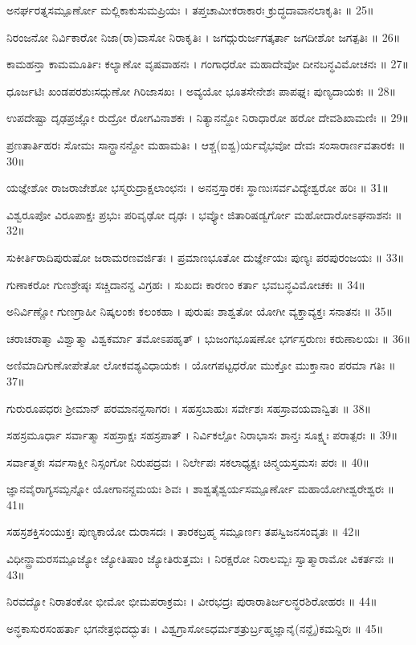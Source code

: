 ಅನರ್ಘರತ್ನಸಮ್ಪೂರ್ಣೋ ಮಲ್ಲಿಕಾಕುಸುಮಪ್ರಿಯಃ ।
ತಪ್ತಚಾಮೀಕರಾಕಾರಃ ಕ್ರುದ್ಧದಾವಾನಲಾಕೃತಿಃ ॥ 25॥

ನಿರಂಜನೋ ನಿರ್ವಿಕಾರೋ ನಿಜಾ(ರಾ)ವಾಸೋ ನಿರಾಕೃತಿಃ ।
ಜಗದ್ಗುರುರ್ಜಗತ್ಕರ್ತಾ ಜಗದೀಶೋ ಜಗತ್ಪತಿಃ ॥ 26॥

ಕಾಮಹನ್ತಾ ಕಾಮಮೂರ್ತಿಃ ಕಲ್ಯಾಣೋ ವೃಷವಾಹನಃ ।
ಗಂಗಾಧರೋ ಮಹಾದೇವೋ ದೀನಬನ್ಧವಿಮೋಚನಃ ॥ 27॥

ಧೂರ್ಜಟಿಃ ಖಂಡಪರಶುಃಸದ್ಗುಣೋ ಗಿರಿಜಾಸಖಃ ।
ಅವ್ಯಯೋ ಭೂತಸೇನೇಶಃ ಪಾಪಘ್ನಃ ಪುಣ್ಯದಾಯಕಃ ॥ 28॥

ಉಪದೇಷ್ಟಾ ದೃಢಪ್ರಜ್ಞೋ ರುದ್ರೋ ರೋಗವಿನಾಶಕಃ ।
ನಿತ್ಯಾನನ್ದೋ ನಿರಾಧಾರೋ ಹರೋ ದೇವಶಿಖಾಮಣಿಃ ॥ 29॥

ಪ್ರಣತಾರ್ತಿಹರಃ ಸೋಮಃ ಸಾನ್ದ್ರಾನನ್ದೋ ಮಹಾಮತಿಃ ।
ಆಶ್ಚ(ಐಶ್ವ)ರ್ಯವೈಭವೋ ದೇವಃ ಸಂಸಾರಾರ್ಣವತಾರಕಃ ॥ 30॥

ಯಜ್ಞೇಶೋ ರಾಜರಾಜೇಶೋ ಭಸ್ಮರುದ್ರಾಕ್ಷಲಾಂಛನಃ ।
ಅನನ್ತಸ್ತಾರಕಃ ಸ್ಥಾಣುಃಸರ್ವವಿದ್ಯೇಶ್ವರೋ ಹರಿಃ ॥ 31॥

ವಿಶ್ವರೂಪೋ ವಿರೂಪಾಕ್ಷಃ ಪ್ರಭುಃ ಪರಿವೃಢೋ ದೃಢಃ ।
ಭವ್ಯೋ ಜಿತಾರಿಷಡ್ವರ್ಗೋ ಮಹೋದಾರೋಽಘನಾಶನಃ ॥ 32॥

ಸುಕೀರ್ತಿರಾದಿಪುರುಷೋ ಜರಾಮರಣವರ್ಜಿತಃ ।
ಪ್ರಮಾಣಭೂತೋ ದುರ್ಜ್ಞೇಯಃ ಪುಣ್ಯಃ ಪರಪುರಂಜಯಃ ॥ 33॥

ಗುಣಾಕರೋ ಗುಣಶ್ರೇಷ್ಠಃ ಸಚ್ಚಿದಾನನ್ದ ವಿಗ್ರಹಃ ।
ಸುಖದಃ ಕಾರಣಂ ಕರ್ತಾ ಭವಬನ್ಧವಿಮೋಚಕಃ ॥ 34॥

ಅನಿರ್ವಿಣ್ಣೋ ಗುಣಗ್ರಾಹೀ ನಿಷ್ಕಲಂಕಃ ಕಲಂಕಹಾ ।
ಪುರುಷಃ ಶಾಶ್ವತೋ ಯೋಗೀ ವ್ಯಕ್ತಾವ್ಯಕ್ತಃ ಸನಾತನಃ ॥ 35॥

ಚರಾಚರಾತ್ಮಾ ವಿಶ್ವಾತ್ಮಾ ವಿಶ್ವಕರ್ಮಾ ತಮೋಽಪಹೃತ್ ।
ಭುಜಂಗಭೂಷಣೋ ಭರ್ಗಸ್ತರುಣಃ ಕರುಣಾಲಯಃ ॥ 36॥

ಅಣಿಮಾದಿಗುಣೋಪೇತೋ ಲೋಕವಶ್ಯವಿಧಾಯಕಃ ।
ಯೋಗಪಟ್ಟಧರೋ ಮುಕ್ತೋ ಮುಕ್ತಾನಾಂ ಪರಮಾ ಗತಿಃ ॥ 37॥

ಗುರುರೂಪಧರಃ ಶ್ರೀಮಾನ್ ಪರಮಾನನ್ದಸಾಗರಃ ।
ಸಹಸ್ರಬಾಹುಃ ಸರ್ವೇಶಃ ಸಹಸ್ರಾವಯವಾನ್ವಿತಃ ॥ 38॥

ಸಹಸ್ರಮೂರ್ಧಾ ಸರ್ವಾತ್ಮಾ ಸಹಸ್ರಾಕ್ಷಃ ಸಹಸ್ರಪಾತ್ ।
ನಿರ್ವಿಕಲ್ಪೋ ನಿರಾಭಾಸಃ ಶಾನ್ತಃ ಸೂಕ್ಷ್ಮಃ ಪರಾತ್ಪರಃ ॥ 39॥

ಸರ್ವಾತ್ಮಕಃ ಸರ್ವಸಾಕ್ಷೀ ನಿಸ್ಸಂಗೋ ನಿರುಪದ್ರವಃ ।
ನಿರ್ಲೇಪಃ ಸಕಲಾಧ್ಯಕ್ಷಃ ಚಿನ್ಮಯಸ್ತಮಸಃ ಪರಃ ॥ 40॥

ಜ್ಞಾನವೈರಾಗ್ಯಸಮ್ಪನ್ನೋ ಯೋಗಾನನ್ದಮಯಃ ಶಿವಃ ।
ಶಾಶ್ವತೈಶ್ವರ್ಯಸಮ್ಪೂರ್ಣೋ ಮಹಾಯೋಗೀಶ್ವರೇಶ್ವರಃ ॥ 41॥

ಸಹಸ್ರಶಕ್ತಿಸಂಯುಕ್ತಃ ಪುಣ್ಯಕಾಯೋ ದುರಾಸದಃ ।
ತಾರಕಬ್ರಹ್ಮ ಸಮ್ಪೂರ್ಣಃ ತಪಸ್ವಿಜನಸಂವೃತಃ ॥ 42॥

ವಿಧೀನ್ದ್ರಾಮರಸಮ್ಪೂಜ್ಯೋ ಜ್ಯೋತಿಷಾಂ ಜ್ಯೋತಿರುತ್ತಮಃ ।
ನಿರಕ್ಷರೋ ನಿರಾಲಮ್ಬಃ ಸ್ವಾತ್ಮಾರಾಮೋ ವಿಕರ್ತನಃ ॥ 43॥

ನಿರವದ್ಯೋ ನಿರಾತಂಕೋ ಭೀಮೋ ಭೀಮಪರಾಕ್ರಮಃ ।
ವೀರಭದ್ರಃ ಪುರಾರಾತಿರ್ಜಲನ್ಧರಶಿರೋಹರಃ ॥ 44॥

ಅನ್ಧಕಾಸುರಸಂಹರ್ತಾ ಭಗನೇತ್ರಭಿದದ್ಭುತಃ ।
ವಿಶ್ವಗ್ರಾಸೋಽಧರ್ಮಶತ್ರುರ್ಬ್ರಹ್ಮಜ್ಞಾನೈ(ನನ್ದೈ)ಕಮನ್ದಿರಃ ॥ 45॥

